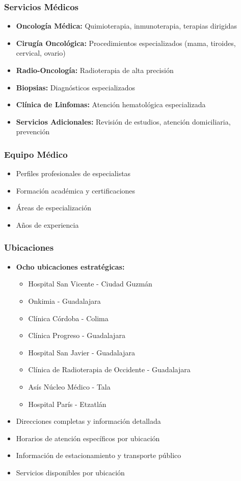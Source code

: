 \documentclass[12pt,a4paper]{article}
\begin{document}
\subsubsection{Servicios Médicos}
\begin{itemize}
    \item \textbf{Oncología Médica:} Quimioterapia, inmunoterapia, terapias dirigidas
    \item \textbf{Cirugía Oncológica:} Procedimientos especializados (mama, tiroides, cervical, ovario)
    \item \textbf{Radio-Oncología:} Radioterapia de alta precisión
    \item \textbf{Biopsias:} Diagnósticos especializados
    \item \textbf{Clínica de Linfomas:} Atención hematológica especializada
    \item \textbf{Servicios Adicionales:} Revisión de estudios, atención domiciliaria, prevención
\end{itemize}

\subsubsection{Equipo Médico}
\begin{itemize}
    \item Perfiles profesionales de especialistas
    \item Formación académica y certificaciones
    \item Áreas de especialización
    \item Años de experiencia
\end{itemize}

\subsubsection{Ubicaciones}
\begin{itemize}
    \item \textbf{Ocho ubicaciones estratégicas:}
    \begin{itemize}
        \item Hospital San Vicente - Ciudad Guzmán
        \item Onkimia - Guadalajara
        \item Clínica Córdoba - Colima
        \item Clínica Progreso - Guadalajara
        \item Hospital San Javier - Guadalajara
        \item Clínica de Radioterapia de Occidente - Guadalajara
        \item Asís Núcleo Médico - Tala
        \item Hospital París - Etzatlán
    \end{itemize}
    \item Direcciones completas y información detallada
    \item Horarios de atención específicos por ubicación
    \item Información de estacionamiento y transporte público
    \item Servicios disponibles por ubicación
\end{itemize}
\end{document}
